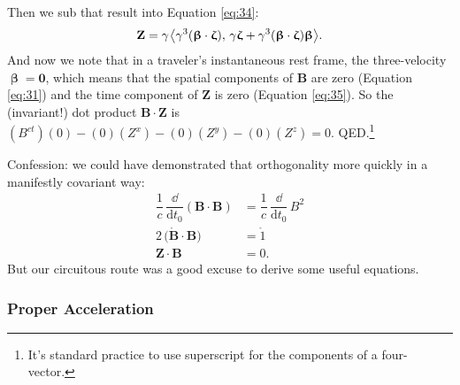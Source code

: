 \documentclass[12pt]{article}
\renewcommand{\vv}[1]{\mathbf{#1}}
\newcommand{\dd}[1]{\mathrm{d}#1}
\newcommand{\vvbeta}{\bm{\upbeta}}
\newcommand{\vvzeta}{\bm{\upzeta}}
\begin{document}
Then we sub that result into Equation \ref{eq:34}:
\begin{equation}\label{eq:35}
\vv Z =\gamma \mkern1.5mu \big \langle \gamma^3 (\vvbeta \cdot \vvzeta), \, \gamma \vvzeta + \gamma^3 (\vvbeta \cdot \vvzeta) \vvbeta \big \rangle.
\end{equation}
And now we note that in a traveler's instantaneous rest frame, the three-velocity $\vvbeta = \vv 0$, which means that the spatial components of $\vv B$ are zero (Equation \ref{eq:31}) and the time component of $\vv Z$ is zero (Equation \ref{eq:35}). So the (invariant!) dot product $\vv B \cdot \vv Z$ is $(B^{ct})(0) - (0)(Z^x) - (0)(Z^y) - (0)(Z^z) = 0$. QED.\footnote{It's standard practice to use superscript for the components of a four-vector.}

Confession: we could have demonstrated that orthogonality more quickly in a manifestly covariant way:
\begin{equation*}
\begin{split}
\dfrac{1}{c} \, \dfrac{\dd}{\dd t_0} \left( \vv B \cdot \vv B \right) &= \dfrac{1}{c} \, \dfrac{\dd}{\dd t_0} \, B^2 \\[2pt]
2 \, \big( \mathring{\vv B} \cdot \vv B \big) &= \mathring{1} \\[3pt]
\vv Z \cdot \vv B &= 0 .
\end{split}
\end{equation*}
But our circuitous route was a good excuse to derive some useful equations.


\subsubsection{Proper Acceleration}\label{sssec:pa}
\end{document}
